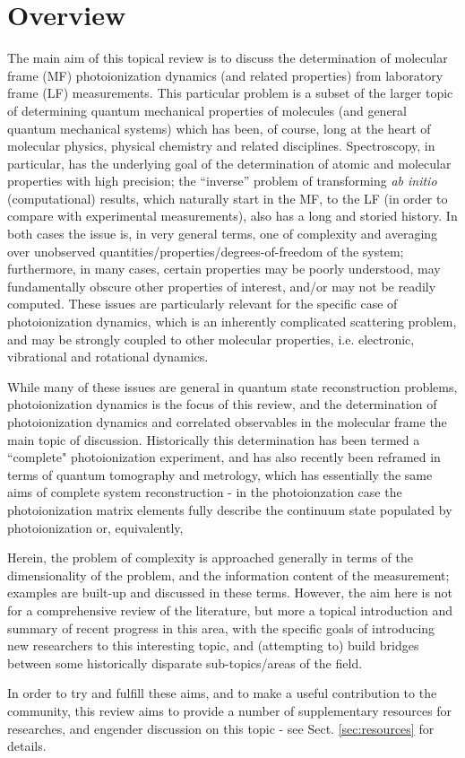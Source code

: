 \section{Overview}
The main aim of this topical review is to discuss the determination of molecular frame (MF) photoionization dynamics (and related properties) from laboratory frame (LF) measurements. This particular problem is a subset of the larger topic of determining quantum mechanical properties of molecules (and general quantum mechanical systems) which has been, of course, long at the heart of molecular physics, physical chemistry and related disciplines. Spectroscopy, in particular, has the underlying goal of the determination of atomic and molecular properties with high precision; the ``inverse” problem of transforming \textit{ab initio} (computational) results, which naturally start in the MF, to the LF (in order to compare with experimental measurements), also has a long and storied history. In both cases the issue is, in very general terms, one of complexity and averaging over unobserved quantities/properties/degrees-of-freedom of the system; furthermore, in many cases, certain properties may be poorly understood, may fundamentally obscure other properties of interest, and/or may not be readily computed. These issues are particularly relevant for the specific case of photoionization dynamics, which is an inherently complicated scattering problem, and may be strongly coupled to other molecular properties, i.e. electronic, vibrational and rotational dynamics. 

While many of these issues are general in quantum state reconstruction problems, photoionization dynamics is the focus of this review, and the determination of photoionization dynamics and correlated observables in the molecular frame the main topic of discussion. Historically this determination has been termed a ``complete" photoionization experiment, and has also recently been reframed in terms of quantum tomography and metrology, which has essentially the same aims of complete system reconstruction - in the photoionzation case the photoionization matrix elements fully describe the continuum state populated by photoionization or, equivalently, 

Herein, the problem of complexity is approached generally in terms of the dimensionality of the problem, and the information content of the measurement; examples are built-up and discussed in these terms. However, the aim here is not for a comprehensive review of the literature, but more a topical introduction and summary of recent progress in this area, with the specific goals of introducing new researchers to this interesting topic, and (attempting to) build bridges between some historically disparate sub-topics/areas of the field.

In order to try and fulfill these aims, and to make a useful contribution to the community, this review aims to provide a number of supplementary resources for researches, and engender discussion on this topic - see Sect. \ref{sec:resources} for details.